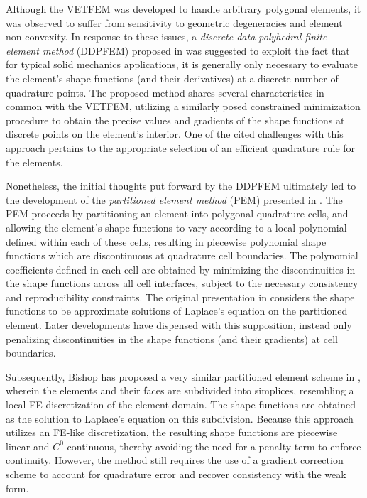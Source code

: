 		Although the VETFEM was developed to handle arbitrary polygonal elements, it was observed to suffer from sensitivity to geometric degeneracies and element non-convexity. In response to these issues, a \textit{discrete data polyhedral finite element method} (DDPFEM) proposed in \cite{Selimotic:08} was suggested to exploit the fact that for typical solid mechanics applications, it is generally only necessary to evaluate the element's shape functions (and their derivatives) at a discrete number of quadrature points. The proposed method shares several characteristics in common with the VETFEM, utilizing a similarly posed constrained minimization procedure to obtain the precise values and gradients of the shape functions at discrete points on the element's interior. One of the cited challenges with this approach pertains to the appropriate selection of an efficient quadrature rule for the elements.
			
		Nonetheless, the initial thoughts put forward by the DDPFEM ultimately led to the development of the \textit{partitioned element method} (PEM) presented in \cite{Rashid:12}. The PEM proceeds by partitioning an element into polygonal quadrature cells, and allowing the element's shape functions to vary according to a local polynomial defined within each of these cells, resulting in piecewise polynomial shape functions which are discontinuous at quadrature cell boundaries. The polynomial coefficients defined in each cell are obtained by minimizing the discontinuities in the shape functions across all cell interfaces, subject to the necessary consistency and reproducibility constraints. The original presentation in \cite{Rashid:12} considers the shape functions to be approximate solutions of Laplace's equation on the partitioned element. Later developments have dispensed with this supposition, instead only penalizing discontinuities in the shape functions (and their gradients) at cell boundaries.
			
		Subsequently, Bishop has proposed a very similar partitioned element scheme in \cite{Bishop:14}, wherein the elements and their faces are subdivided into simplices, resembling a local FE discretization of the element domain. The shape functions are obtained as the solution to Laplace's equation on this subdivision. Because this approach utilizes an FE-like discretization, the resulting shape functions are piecewise linear and $C^0$ continuous, thereby avoiding the need for a penalty term to enforce continuity. However, the method still requires the use of a gradient correction scheme to account for quadrature error and recover consistency with the weak form.

